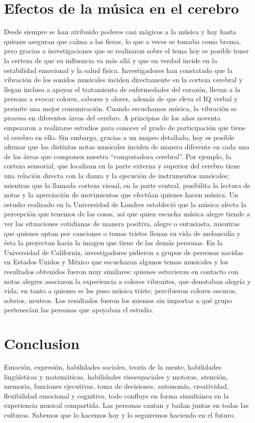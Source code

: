 \documentclass{bmcart}
\begin{document}
\section*{Efectos de la música en el cerebro}
Desde siempre se han atribuido poderes casi mágicos a la música y hay hasta quienes aseguran que calma a las fieras, lo que a veces se tomaba como broma, pero gracias a investigaciones que se realizaron sobre el tema hoy es posible tener la certeza de que su influencia va más allá y que en verdad incide en la estabilidad emocional y la salud física.
Investigadores han constatado que la vibración de los sonidos musicales inciden directamente en la corteza cerebral y llegan incluso a apoyar el tratamiento de enfermedades del corazón, llevan a la persona a evocar colores, sabores y olores, además de que eleva el IQ verbal y permite una mejor comunicación.
Cuando escuchamos música, la vibración se procesa en diferentes áreas del cerebro. A principios de los años noventa empezaron a realizarse estudios para conocer el grado de participación que tiene el cerebro en ello. Sin embargo, gracias a un mapeo detallado, hoy es posible afirmar que las distintas notas musicales inciden de manera diferente en cada una de las áreas que componen nuestra “computadora cerebral”.
Por ejemplo, la corteza sensorial, que localizan en la parte externa y superior del cerebro tiene una relación directa con la danza y la ejecución de instrumentos musicales; mientras que la llamada corteza visual, en la parte central, posibilita la lectura de notas y la apreciación de movimientos que efectúan quienes hacen música.
Un estudio realizado en la Universidad de Londres estableció que la música afecta la percepción que tenemos de las cosas, así que quien escucha música alegre tiende a ver las situaciones cotidianas de manera positiva, alegre o entusiasta, mientras que quienes optan por canciones o temas tristes llenan su vida de melancolía y ésta la proyectan hacia la imagen que tiene de las demás personas.
En la Universidad de California, investigadores pidieron a grupos de personas nacidas en Estados Unidos y México que escucharan algunos temas musicales y los resultados obtenidos fueron muy similares: quienes estuvieron en contacto con notas alegres asociaron la experiencia a colores vibrantes, que denotaban alegría y vida; en tanto a quienes se les puso música triste, percibieron colores oscuros, sobrios, neutros. 
Los resultados fueron los mismos sin importar a qué grupo pertenecían las personas que apoyaban el estudio.
\section*{Conclusion}
Emoción, expresión, habilidades sociales, teoría de la mente, habilidades lingüísticas y matemáticas, habilidades visoespaciales y motoras, atención, memoria, funciones ejecutivas, toma de decisiones, autonomía, creatividad, flexibilidad emocional y cognitiva, todo confluye en forma simultánea en la experiencia musical compartida. Las personas cantan y bailan juntas en todas las culturas. Sabemos que lo hacemos hoy y lo seguiremos haciendo en el futuro.
\end{document}
